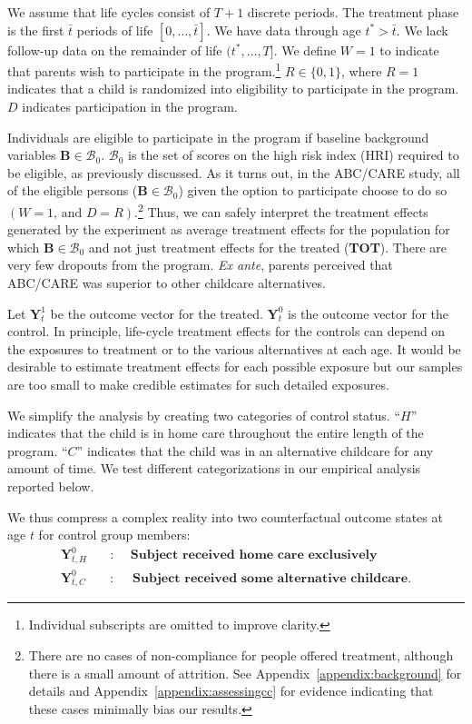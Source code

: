 We assume that life cycles consist of $T+1$ discrete periods. The treatment phase is the first $\bar{t}$ periods of life $\left[0,\dots,\bar{t}\right]$. We have data through age $t^{*}>\bar{t}$. We lack follow-up data on the remainder of life $(t^*,\dots,T]$. We define $W=1$ to indicate that parents wish to participate in the program.\footnote{Individual subscripts are omitted to improve clarity.} $R \in \{0,1\}$, where $R=1$ indicates that a child is randomized into eligibility to participate in the program. $D$ indicates participation in the program.

Individuals are eligible to participate in the program if baseline background variables $\bm{B}\in\mathcal{B}_0$. $\mathcal{B}_0$ is the set of scores on the high risk index (HRI) required to be eligible, as previously discussed. As it turns out, in the ABC/CARE study, all of the eligible persons ($\bm{B}\in\mathcal{B}_0$) given the option to participate choose to do so $(W=1\text{, and } D=R)$.\footnote{There are no cases of non-compliance for people offered treatment, although there is a small amount of attrition. See Appendix~\ref{appendix:background} for details and Appendix~\ref{appendix:assessingcc} for evidence indicating that these cases minimally bias our results.} Thus, we can safely interpret the treatment effects generated by the experiment as average treatment effects for the population for which $\bm{B}\in\mathcal{B}_0$ and not just treatment effects for the treated (\textbf{TOT}). There are very few dropouts from the program. \emph{Ex ante}, parents perceived that ABC/CARE was superior to other childcare alternatives.

Let $\bm{Y}^1_t$ be the outcome vector for the treated. $\bm{Y}^0_t$ is the outcome vector for the control. In principle, life-cycle treatment effects for the controls can depend on the exposures to treatment or to the various alternatives at each age. It would be desirable to estimate treatment effects for each possible exposure but our samples are too small to make credible estimates for such detailed exposures.

We simplify the analysis by creating two categories of control status. ``$H$'' indicates that the child is in home care throughout the entire length of the program. ``$C$'' indicates that the child was in an alternative childcare for any amount of time. We test different categorizations in our empirical analysis reported below.

We thus compress a complex reality into two counterfactual outcome states at age $t$ for control group members:
\begin{align*}
\bm{Y}_{t,H}^0 \quad &: \quad \textbf{ Subject received home care exclusively} \\
\bm{Y}_{t,C}^0 \quad &: \quad \textbf{ Subject received some alternative childcare}.
\end{align*}

